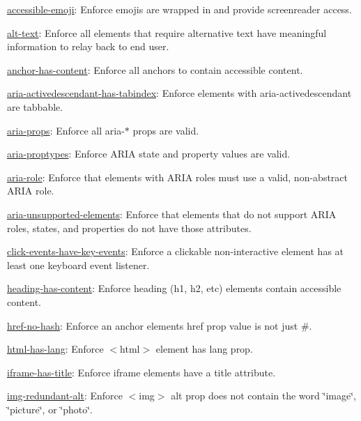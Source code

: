 \begin{DoxyItemize}
\item \mbox{\hyperlink{accessible-emoji_8md}{accessible-\/emoji}}\+: Enforce emojis are wrapped in  and provide screenreader access.
\item \mbox{\hyperlink{alt-text_8md}{alt-\/text}}\+: Enforce all elements that require alternative text have meaningful information to relay back to end user.
\item \mbox{\hyperlink{anchor-has-content_8md}{anchor-\/has-\/content}}\+: Enforce all anchors to contain accessible content.
\item \mbox{\hyperlink{aria-activedescendant-has-tabindex_8md}{aria-\/activedescendant-\/has-\/tabindex}}\+: Enforce elements with aria-\/activedescendant are tabbable.
\item \mbox{\hyperlink{aria-props_8md}{aria-\/props}}\+: Enforce all {\ttfamily aria-\/$\ast$} props are valid.
\item \mbox{\hyperlink{aria-proptypes_8md}{aria-\/proptypes}}\+: Enforce A\+R\+IA state and property values are valid.
\item \mbox{\hyperlink{aria-role_8md}{aria-\/role}}\+: Enforce that elements with A\+R\+IA roles must use a valid, non-\/abstract A\+R\+IA role.
\item \mbox{\hyperlink{aria-unsupported-elements_8md}{aria-\/unsupported-\/elements}}\+: Enforce that elements that do not support A\+R\+IA roles, states, and properties do not have those attributes.
\item \mbox{\hyperlink{click-events-have-key-events_8md}{click-\/events-\/have-\/key-\/events}}\+: Enforce a clickable non-\/interactive element has at least one keyboard event listener.
\item \mbox{\hyperlink{heading-has-content_8md}{heading-\/has-\/content}}\+: Enforce heading ({\ttfamily h1}, {\ttfamily h2}, etc) elements contain accessible content.
\item \mbox{\hyperlink{href-no-hash_8md}{href-\/no-\/hash}}\+: Enforce an anchor element\textquotesingle{}s {\ttfamily href} prop value is not just {\ttfamily \#}.
\item \mbox{\hyperlink{html-has-lang_8md}{html-\/has-\/lang}}\+: Enforce {\ttfamily $<$html$>$} element has {\ttfamily lang} prop.
\item \mbox{\hyperlink{iframe-has-title_8md}{iframe-\/has-\/title}}\+: Enforce iframe elements have a title attribute.
\item \mbox{\hyperlink{img-redundant-alt_8md}{img-\/redundant-\/alt}}\+: Enforce {\ttfamily $<$img$>$} alt prop does not contain the word \char`\"{}image\char`\"{}, \char`\"{}picture\char`\"{}, or \char`\"{}photo\char`\"{}.

\end{DoxyItemize}
